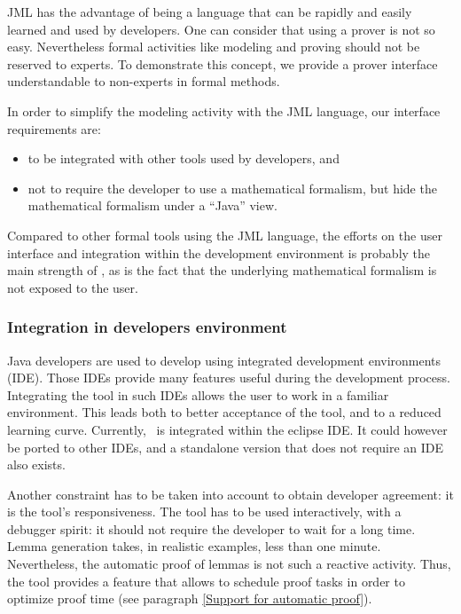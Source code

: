 \label{Industrialisation}
JML has the advantage of being a language that can be rapidly and
easily learned and used by developers. One can consider that using a
prover is not so easy. Nevertheless formal activities like modeling
and proving should not be reserved to experts. To demonstrate this
concept, we provide a prover interface understandable to non-experts
in formal methods.

In order to simplify the modeling activity with the JML language, our
interface requirements are:
\begin{itemize}
 \item to be integrated with other tools used by developers, and
 \item not to require the developer to use a mathematical formalism,
    but hide the mathematical formalism under a ``Java'' view.
\end{itemize}
Compared to other formal tools using the JML language, the efforts on
the user interface and integration within the development
environment is probably the main strength of \JACK, as is the fact
that the underlying mathematical formalism is not exposed to the
user.
\subsubsection{Integration in developers environment}
 Java developers are used to develop using integrated development
environments (IDE).  Those IDEs provide many features useful during
the development process.  Integrating the tool in such IDEs allows the
user to work in a familiar environment.  This leads both to better
acceptance of the tool, and to a reduced learning curve.  Currently,
\JACK\ is integrated within the eclipse IDE.  It could however be ported
to other IDEs, and a standalone version that does not require an IDE
also exists.

 Another constraint has to be taken into account to obtain developer
 agreement: it is the tool's responsiveness.  The tool has to be used interactively, with a
 debugger spirit: it should not require the developer to wait for a
 long time.  Lemma generation takes, in realistic examples, less
 than one minute. %
 Nevertheless, the automatic proof of lemmas is not such a  reactive
 activity. Thus, the tool provides a feature that allows to schedule proof
 tasks in order to optimize proof time (see paragraph \ref{Support for
 automatic proof}).


